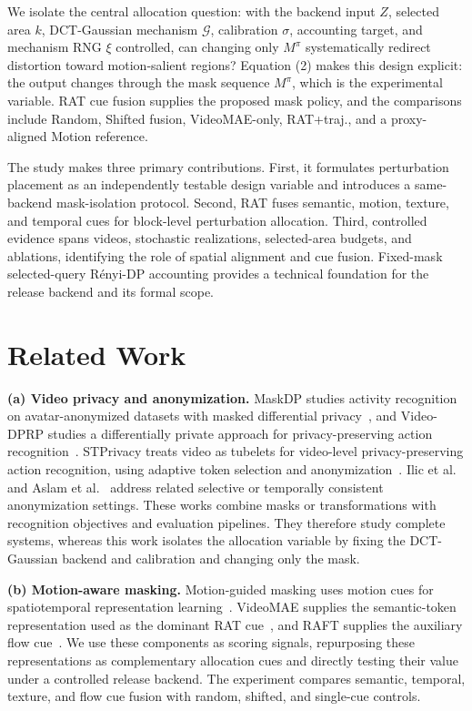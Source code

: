 We isolate the central allocation question: with the backend input \(Z\),
selected area \(k\), DCT-Gaussian mechanism \(\mathcal{G}\), calibration
\(\sigma\), accounting target, and mechanism RNG \(\xi\) controlled, can
changing only \(M^\pi\) systematically redirect distortion toward
motion-salient regions? Equation (2) makes this design explicit: the output
changes through the mask sequence \(M^\pi\), which is the experimental
variable. RAT cue fusion supplies the proposed mask policy, and the comparisons
include Random, Shifted fusion, VideoMAE-only, RAT+traj., and a proxy-aligned
Motion reference.

The study makes three primary contributions. First, it formulates perturbation
placement as an independently testable design variable and introduces a
same-backend mask-isolation protocol. Second, RAT fuses semantic, motion,
texture, and temporal cues for block-level perturbation allocation. Third,
controlled evidence spans videos, stochastic realizations, selected-area
budgets, and ablations, identifying the role of spatial alignment and cue
fusion. Fixed-mask selected-query R\'enyi-DP accounting provides a technical
foundation for the release backend and its formal scope.

\section{Related Work}
\label{sec:related}

\noindent\textbf{(a) Video privacy and anonymization.}
MaskDP studies activity recognition on avatar-anonymized datasets with masked
differential privacy~\cite{schneider2024maskdp}, and Video-DPRP studies a
differentially private approach for privacy-preserving action
recognition~\cite{nken2025videodprp}. STPrivacy treats video as tubelets for
video-level privacy-preserving action recognition, using adaptive token
selection and anonymization~\cite{li2023stprivacy}. Ilic et
al.~\cite{ilic2024selective} and Aslam et al.~\cite{aslam2026tokenprune}
address related selective or temporally consistent anonymization settings. These
works combine masks or transformations with recognition objectives and
evaluation pipelines. They therefore study complete systems, whereas this work
isolates the allocation variable by fixing the DCT-Gaussian backend and
calibration and changing only the mask.

\noindent\textbf{(b) Motion-aware masking.}
Motion-guided masking uses motion cues for spatiotemporal representation
learning~\cite{fan2023mgm}. VideoMAE supplies the semantic-token representation
used as the dominant RAT cue~\cite{tong2022videomae}, and RAFT supplies the
auxiliary flow cue~\cite{teed2020raft}. We use these components as scoring
signals, repurposing these representations as complementary allocation cues
and directly testing their value under a controlled release backend. The
experiment compares semantic, temporal, texture, and flow cue fusion with
random, shifted, and single-cue controls.

